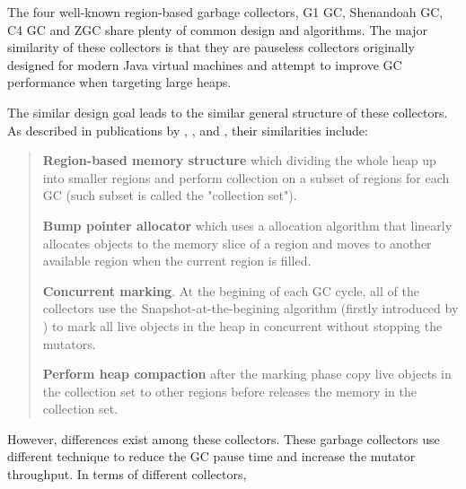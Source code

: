 The four well-known region-based garbage collectors, G1 GC, Shenandoah GC, C4 GC and
ZGC share plenty of common design and algorithms. The major similarity of these collectors
is that they are pauseless collectors originally designed for modern Java virtual
machines and attempt to improve GC performance when targeting large heaps.

The similar design goal leads to the similar general structure of these collectors.
As described in publications by \cite{detlefs2004garbage}, \cite{flood2016shenandoah},
\cite{tene2011c4} and \cite{liden_karlsson_2018}, their similarities include:

\begin{quote}
  \textbf{Region-based memory structure}
    which dividing the whole heap up into smaller regions and perform collection
    on a subset of regions for each GC (such subset is called the "collection set").

  \textbf{Bump pointer allocator}
    which uses a allocation algorithm that linearly allocates objects to the memory
    slice of a region and moves to another available region when the current region is filled.

  \textbf{Concurrent marking}.
    At the begining of each GC cycle, all of the collectors use the Snapshot-at-the-begining algorithm
    (firstly introduced by \cite{yuasa1990real}) to mark all live objects in the heap
    in concurrent without stopping the mutators.

  \textbf{Perform heap compaction}
    after the marking phase copy live objects in the collection set to other
    regions before releases the memory in the collection set.
\end{quote}

However, differences exist among these collectors. These garbage collectors use
different technique to reduce the GC pause time and increase the mutator throughput.
In terms of different collectors,

